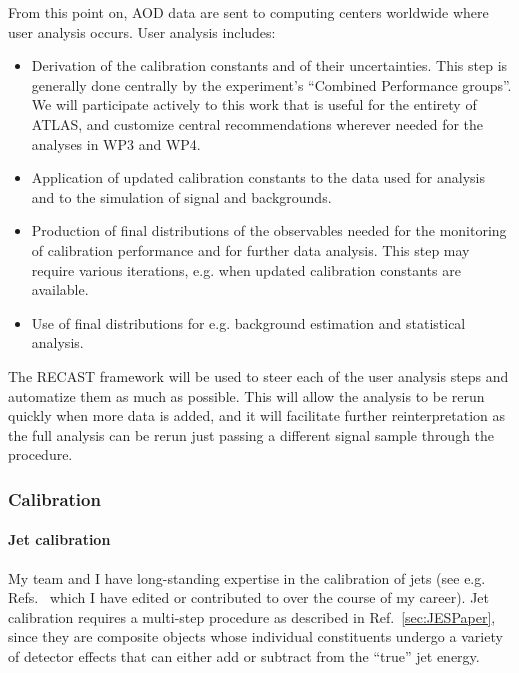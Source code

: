 From this point on, AOD data are sent to computing centers worldwide where user analysis occurs. User analysis includes:

\begin{itemize}
\item Derivation of the calibration constants and of their uncertainties. This step is generally done centrally by the experiment’s “Combined Performance groups”. We will participate actively to this work that is useful for the entirety of ATLAS, and customize central recommendations wherever needed for the analyses in WP3 and WP4. 
\item Application of updated calibration constants to the data used for analysis and to the simulation of signal and backgrounds.  
\item Production of final distributions of the observables needed for the monitoring of calibration performance and for further data analysis. This step may require various iterations, e.g. when updated calibration constants are available. 
\item Use of final distributions for e.g. background estimation and statistical analysis.
\end{itemize}

The RECAST framework will be used to steer each of the user analysis steps and automatize them as much as possible. This will allow the analysis to be rerun quickly when more data is added, and it will facilitate further reinterpretation as the full analysis can be rerun just passing a different signal sample through the procedure. 


\subsubsection{Calibration}


\paragraph{Jet calibration} My team and I have long-standing expertise in the calibration of jets (see e.g. Refs.~\cite{JESPapersIAmAuthorOf} which I have edited or contributed to over the course of my career). 
Jet calibration requires a multi-step procedure as described in Ref.~\ref{sec:JESPaper}, since they are composite objects whose individual constituents undergo a variety of detector effects that can either add or subtract from the “true” jet energy. 

